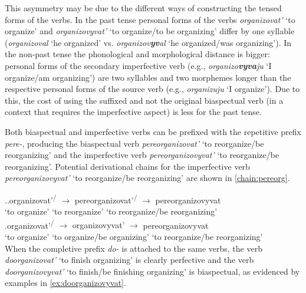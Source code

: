 This asymmetry may be due to the different ways of constructing the tensed forms of the verbs. In the past tense personal forms of the verbs \textit{organizovat'} `to organize' and \textit{organizovyvat'}\textsuperscript{\IPF} `to organize/to be organizing' differ by one syllable (\textit{organizoval} `he organized' vs. \textit{organizov\textbf{yv}al} `he organized/was organizing'). In the non-past tense the phonological and morphological distance is bigger: personal forms of the secondary imperfective verb (e.g., \textit{organizo\textbf{vyva}ju} `I organize/am organizing') are two syllables and two morphemes longer than the respective personal forms of the source verb (e.g., \textit{organizuju} `I organize'). Due to this, the cost of using the suffixed and not the original biaspectual verb (in a context that requires the imperfective aspect) is less for the past tense.

Both biaspectual and imperfective verbs can be prefixed with the repetitive prefix \textit{pere-}, producing the biaspectual verb \textit{pereorganizovat'} `to reorganize/be reorganizing' and the imperfective verb \textit{pereorganizovyvat'} `to reorganize/be reorganizing'. Potential derivational chains for the imperfective verb \textit{pereorganizovyvat'} `to reorganize/be reorganizing' are shown in \ref{chain:pereorg}. 

\ex.\label{chain:pereorg}\ag.organizovat'\textsuperscript{\PF\slash\IPF} {$\rightarrow$} {pereorganizovat'\textsuperscript{\PF\slash\IPF}} {$\rightarrow$} pereorganizovyvat\textsuperscript{\IPF}\\
{`to organize'} {} {`to reorganize'} {} {`to reorganize/be reorganizing'}\\
\bg.organizovat'\textsuperscript{\PF\slash\IPF} {$\rightarrow$} {organizovyvat'\textsuperscript{\IPF}} {$\rightarrow$} pereorganizovyvat\textsuperscript{\IPF}\\
{`to organize'} {} {`to organize/be organizing'} {} {`to reorganize/be reorganizing'}\\

When the completive prefix \textit{do-} is attached to the same verbs, the verb \textit{doorganizovat'} `to finish organizing' is clearly perfective and the verb \textit{doorganizovyvat'} `to finish/be finishing organizing' is biaspectual, as evidenced by examples in \ref{ex:doorganizovyvat}.

